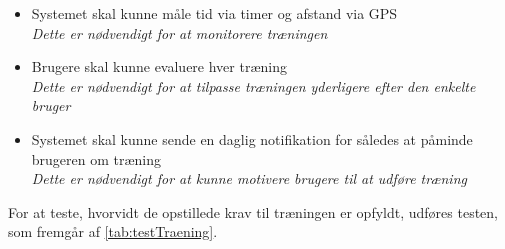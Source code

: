 \begin{itemize}
\item Systemet skal kunne måle tid via timer og afstand via GPS
\\
\textit{Dette er nødvendigt for at monitorere træningen}
\item Brugere skal kunne evaluere hver træning
\\
\textit{Dette er nødvendigt for at tilpasse træningen yderligere efter den enkelte bruger}
\item Systemet skal kunne sende en daglig notifikation for således at påminde brugeren om træning
\\
\textit{Dette er nødvendigt for at kunne motivere brugere til at udføre træning}
\end{itemize}

\noindent
For at teste, hvorvidt de opstillede krav til træningen er opfyldt, udføres testen, som fremgår af \autoref{tab:testTraening}.

